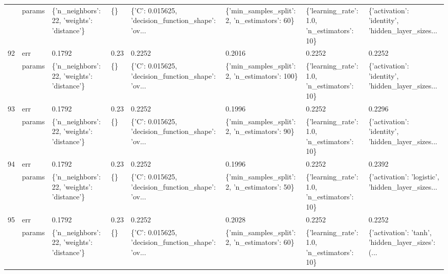 \begin{tabular}{llllllll}
    & params &  \{'n\_neighbors': 22, 'weights': 'distance'\} &      \{\} &  \{'C': 0.015625, 'decision\_function\_shape': 'ov... &   \{'min\_samples\_split': 2, 'n\_estimators': 60\} &   \{'learning\_rate': 1.0, 'n\_estimators': 10\} &  \{'activation': 'identity', 'hidden\_layer\_sizes... \\
92  & err &                                      0.1792 &    0.23 &                                             0.2252 &                                         0.2016 &                                       0.2252 &                                             0.2252 \\
    & params &  \{'n\_neighbors': 22, 'weights': 'distance'\} &      \{\} &  \{'C': 0.015625, 'decision\_function\_shape': 'ov... &  \{'min\_samples\_split': 2, 'n\_estimators': 100\} &   \{'learning\_rate': 1.0, 'n\_estimators': 10\} &  \{'activation': 'identity', 'hidden\_layer\_sizes... \\
93  & err &                                      0.1792 &    0.23 &                                             0.2252 &                                         0.1996 &                                       0.2252 &                                             0.2296 \\
    & params &  \{'n\_neighbors': 22, 'weights': 'distance'\} &      \{\} &  \{'C': 0.015625, 'decision\_function\_shape': 'ov... &   \{'min\_samples\_split': 2, 'n\_estimators': 90\} &   \{'learning\_rate': 1.0, 'n\_estimators': 10\} &  \{'activation': 'identity', 'hidden\_layer\_sizes... \\
94  & err &                                      0.1792 &    0.23 &                                             0.2252 &                                         0.1996 &                                       0.2252 &                                             0.2392 \\
    & params &  \{'n\_neighbors': 22, 'weights': 'distance'\} &      \{\} &  \{'C': 0.015625, 'decision\_function\_shape': 'ov... &   \{'min\_samples\_split': 2, 'n\_estimators': 50\} &   \{'learning\_rate': 1.0, 'n\_estimators': 10\} &  \{'activation': 'logistic', 'hidden\_layer\_sizes... \\
95  & err &                                      0.1792 &    0.23 &                                             0.2252 &                                         0.2028 &                                       0.2252 &                                             0.2252 \\
    & params &  \{'n\_neighbors': 22, 'weights': 'distance'\} &      \{\} &  \{'C': 0.015625, 'decision\_function\_shape': 'ov... &   \{'min\_samples\_split': 2, 'n\_estimators': 60\} &   \{'learning\_rate': 1.0, 'n\_estimators': 10\} &  \{'activation': 'tanh', 'hidden\_layer\_sizes': (... \\

\end{tabular}
